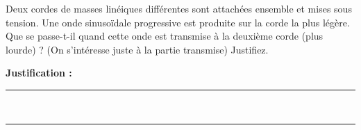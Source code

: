 Deux cordes de masses linéiques différentes sont attachées ensemble et mises sous tension. Une onde sinusoïdale progressive est produite sur la corde la plus légère. Que se passe-t-il quand cette onde est transmise à la deuxième corde (plus lourde) ? (On s'intéresse juste à la partie transmise) Justifiez.

\choices

\noindent\textbf{Justification :} \hrulefill \\[2.5ex]
\rule{\linewidth}{0.4pt} \\[2.5ex]
\rule{\linewidth}{0.4pt}
\vfill